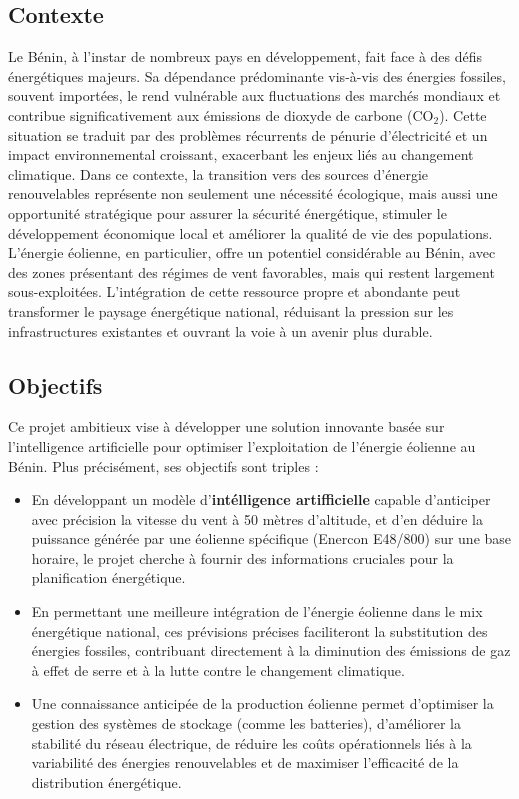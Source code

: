 \documentclass[12pt]{article}
\begin{document}
\subsection{Contexte}
Le Bénin, à l'instar de nombreux pays en développement, fait face à des défis énergétiques majeurs. Sa dépendance prédominante vis-à-vis des énergies fossiles, souvent importées, le rend vulnérable aux fluctuations des marchés mondiaux et contribue significativement aux émissions de dioxyde de carbone (CO$_2$). Cette situation se traduit par des problèmes récurrents de pénurie d'électricité et un impact environnemental croissant, exacerbant les enjeux liés au changement climatique. Dans ce contexte, la transition vers des sources d'énergie renouvelables représente non seulement une nécessité écologique, mais aussi une opportunité stratégique pour assurer la sécurité énergétique, stimuler le développement économique local et améliorer la qualité de vie des populations. L'énergie éolienne, en particulier, offre un potentiel considérable au Bénin, avec des zones présentant des régimes de vent favorables, mais qui restent largement sous-exploitées. L'intégration de cette ressource propre et abondante peut transformer le paysage énergétique national, réduisant la pression sur les infrastructures existantes et ouvrant la voie à un avenir plus durable.
\subsection{Objectifs}
Ce projet ambitieux vise à développer une solution innovante basée sur l'intelligence artificielle pour optimiser l'exploitation de l'énergie éolienne au Bénin. Plus précisément, ses objectifs sont triples : 
\begin{itemize}[label=$\color{blue}\circledast$]
	\item \textbf{\color{blue}{Prédire la vitesse du vent et la production horaire d'énergie éolienne:}} En développant un modèle d'\textbf{intélligence artifficielle} capable d'anticiper avec précision la vitesse du vent à 50 mètres d'altitude, et d'en déduire la puissance générée par une éolienne spécifique (Enercon E48/800) sur une base horaire, le projet cherche à fournir des informations cruciales pour la planification énergétique.
	\item \textbf{\color{blue}{Réduire la dépendance aux combustibles fossiles et les émissions de CO$_2$:}} En permettant une meilleure intégration de l'énergie éolienne dans le mix énergétique national, ces prévisions précises faciliteront la substitution des énergies fossiles, contribuant directement à la diminution des émissions de gaz à effet de serre et à la lutte contre le changement climatique.
	\item \textbf{\color{blue}{Optimiser le stockage d'énergie et faciliter l'intégration au réseau électrique:}} Une connaissance anticipée de la production éolienne permet d'optimiser la gestion des systèmes de stockage (comme les batteries), d'améliorer la stabilité du réseau électrique, de réduire les coûts opérationnels liés à la variabilité des énergies renouvelables et de maximiser l'efficacité de la distribution énergétique.
\end{itemize}
\end{document}

